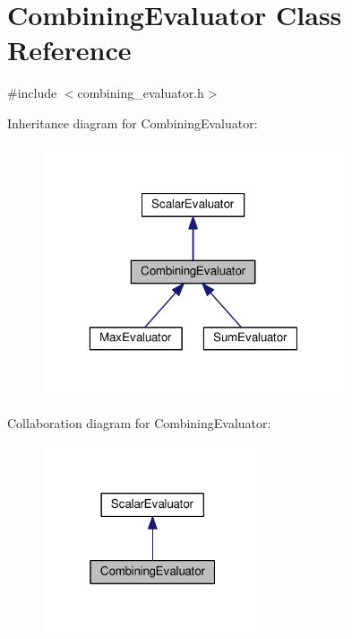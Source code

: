 \hypertarget{classCombiningEvaluator}{\section{Combining\-Evaluator Class Reference}
\label{classCombiningEvaluator}
}


{\ttfamily \#include $<$combining\-\_\-evaluator.\-h$>$}



Inheritance diagram for Combining\-Evaluator\-:
\nopagebreak
\begin{figure}[H]
\begin{center}
\leavevmode
\includegraphics[width=253pt]{classCombiningEvaluator__inherit__graph}
\end{center}
\end{figure}


Collaboration diagram for Combining\-Evaluator\-:
\nopagebreak
\begin{figure}[H]
\begin{center}
\leavevmode
\includegraphics[width=184pt]{classCombiningEvaluator__coll__graph}
\end{center}
\end{figure}
